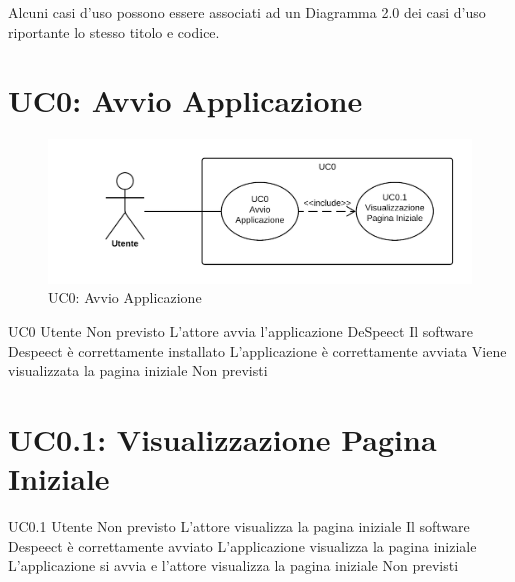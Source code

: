 \documentclass[../AnalisideiRequisiti.tex]{subfiles}
\begin{document}
	\noindent Alcuni casi d'uso possono essere associati ad un Diagramma  2.0 dei casi d'uso riportante lo stesso titolo e codice.

	\section{UC0: Avvio Applicazione}
	\begin{figure}[H]
		\centering
		\includegraphics[width=\textwidth]{../img/UC0.png}
		\caption{UC0: Avvio Applicazione}
	\end{figure}
	\UserCase
	{UC0}
	{Utente}
	{Non previsto}
	{L'attore avvia l'applicazione DeSpeect}
	{Il software Despeect è correttamente installato}
	{L'applicazione è correttamente avviata}
	{Viene visualizzata la pagina iniziale }
	{Non previsti}
	
	\section{UC0.1: Visualizzazione Pagina Iniziale}
	\UserCase
	{UC0.1}
	{Utente}
	{Non previsto}
	{L'attore visualizza la pagina iniziale}
	{Il software Despeect è correttamente avviato }
	{L'applicazione visualizza la pagina iniziale}
	{L'applicazione si avvia e l'attore visualizza la pagina iniziale}
	{Non previsti}
	
\end{document}
